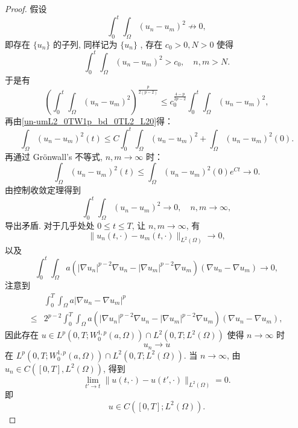 \documentclass[oneside,longtitle]{LZUthesis}
\theoremstyle{definition}
\numberwithin{equation}{chapter}
\newcommand*\abs[1]{\lvert#1\rvert}
\newcommand*\norm[1]{\lVert#1\rVert}
\newcommand*\Brace[1]{\lbrace#1\rbrace}
\begin{document}
\begin{proof}
	假设
	\begin{equation*}
		\int_0^t\int_{\Omega}\left(u_n-u_m\right)^2 \not\to 0,
	\end{equation*}
	即存在 $\Brace{u_n}$ 的子列, 同样记为 $\Brace{u_n}$ , 存在 $c_0 > 0, N > 0$ 使得
	\begin{equation*}
		\int_0^t\int_{\Omega}\left(u_n-u_m\right)^2 > c_0, \quad n, m > N.
	\end{equation*}
	于是有
	\begin{equation*}
		\left(\int_0^t\int_{\Omega}\left(u_n-u_m\right)^2\right)^{\frac{p}{2(p-2)}}
		\leq c_0^{\frac{4-p}{2p-2}}\int_0^t\int_{\Omega}\left(u_n-u_m\right)^2,
	\end{equation*}
	再由\cref{un-umL2_0TW1p_bd_0TL2_L20}得：
	\begin{equation}
		\int_{\Omega}\left(u_n-u_m\right)^2(t)
		\leq C\int_0^t\int_{\Omega}\left(u_n-u_m\right)^2
		+ \int_{\Omega}\left(u_n-u_m\right)^2(0).
	\end{equation}
	再通过 Gr\"onwall's 不等式, $n, m \to \infty$ 时：
	\begin{equation}
		\int_{\Omega}\left( u_n-u_m \right)^2(t)
		\leq \int_{\Omega}\left(u_n-u_m\right)^2(0)e^{Ct} \to 0.
	\end{equation}
	由控制收敛定理得到
	\begin{equation}
		\int_0^t\int_{\Omega}\left(u_n-u_m\right)^2 \to 0, \quad n, m \to \infty,
	\end{equation}
	导出矛盾. 对于几乎处处 $0 \leq t \leq T$, 让 $n,m \to \infty$, 有
	\begin{equation}\label{cauchy_in_L2}
		\norm{u_n(t,\cdot)-u_m(t,\cdot)}_{L^2(\Omega)} \to 0,
	\end{equation}
	以及
	\begin{equation}\label{cauchy_in_W1pa}
		\int_{0}^{t}\int_{\Omega}a
		\left(\abs{\nabla u_n}^{p-2}\nabla u_n
		- \abs{\nabla u_m}^{p-2}\nabla u_m\right)
		\left(\nabla u_n - \nabla u_m\right)
		\to 0,
	\end{equation}
	注意到
	\begin{equation}
		\begin{split}
			& \int_0^T\int_{\Omega}a\abs{\nabla u_n - \nabla u_m}^p\\
			\leq{} & 2^{p-2}\int_{0}^{T}\int_{\Omega}a
			\left(\abs{\nabla u_n}^{p-2}\nabla u_n
			- \abs{\nabla u_m}^{p-2}\nabla u_m\right)
			\left(\nabla u_n - \nabla u_m\right),
		\end{split}
	\end{equation}
	因此存在 $u \in L^p(0, T; W_0^{1,p}(a,\Omega))
		\cap L^2(0, T; L^2(\Omega))$ 使得 $n \to \infty$ 时
	\begin{equation}
		u_{n} \to u
	\end{equation}
	在 $L^p(0, T; W_0^{1,p}(a,\Omega))\cap L^2(0, T; L^2(\Omega))$.
	当 $n \to \infty$, 由 $u_n \in C([0, T], L^2(\Omega))$, 得到
	\begin{equation}
		\lim_{t' \to t}\norm{u(t,\cdot)-u(t',\cdot)}_{L^2(\Omega)}=0.
	\end{equation}
	即
	\begin{equation*}
		u \in C([0, T]; L^2(\Omega)).
	\end{equation*}


\end{proof}
\end{document}
